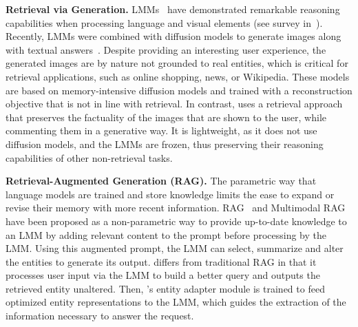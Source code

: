\noindent\textbf{Retrieval via Generation.}
LMMs~\cite{openai2024gpt4,geminiteam2024gemini,anthropic2024claude,zhu2024minigpt,liu2023llava,liu2023improvedllava,chen2024far,jiang2024mantis, wang2024qwen2, ye2024mplug, chen2024internvl, mckinzie2024mm1, wu2023next, dubey2024llama, agrawal2024pixtral, lin2024mmembeduniversalmultimodalretrieval} have demonstrated remarkable reasoning capabilities when processing language and visual elements (see survey in~\cite{yin2023survey}).
%
Recently, LMMs were combined with diffusion models to generate images along with textual answers~\cite{tian2024mminterleaved, li2023textbind, koh2023grounding, wu2023next, ge2023making, yu2023language, team2024chameleon}.
%
%
Despite providing an interesting user experience, the generated images are by nature not grounded to real entities, which is critical for retrieval applications, such as online shopping, news, or Wikipedia.
%
%
These models are based on memory-intensive diffusion models and trained with a reconstruction objective that is not in line with retrieval.
%
%
In contrast, \modelname uses a retrieval approach that preserves the factuality of the images that are shown to the user, while commenting them in a generative way. 
It is lightweight, as it does not use diffusion models, and the LMMs are frozen, thus preserving their reasoning capabilities of other non-retrieval tasks.


\noindent\textbf{Retrieval-Augmented Generation (RAG).}
The parametric way that language models are trained and store knowledge limits the ease to expand or revise their memory with more recent information.
RAG~\cite{lee2019latent, lewis2020retrieval, guu2020retrieval, karpukhin2020dense,fevry2020entities} and Multimodal RAG~\cite{qi2024roravlm, hu2023reveal, yu2024visrag, chen2022murag, qu2024alleviating, caffagni2024wiki, yan-xie-2024-echosight} have been proposed as a non-parametric way to provide up-to-date knowledge to an LMM by adding relevant content to the prompt before processing by the LMM.
Using this augmented prompt, the LMM can select, summarize and alter the entities to generate its output.
\modelname differs from traditional RAG in that it processes user input via the LMM to build a better query and outputs the retrieved entity unaltered.
Then, \modelname's entity adapter module is trained to feed optimized entity representations to the LMM, which guides the extraction of the information necessary to answer the request.
%
%
%
%
%
%
%



